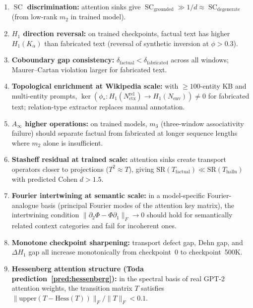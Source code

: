 \documentclass[11pt]{amsart}
\theoremstyle{definition}
\newcommand{\Nctx}{N_{\mathrm{ctx}}}
\newcommand{\Nenv}{N_{\mathrm{env}}}
\newcommand{\Ka}{K_\alpha}
\newcommand{\cobdry}{\delta}
\DeclareMathOperator{\SC}{SC}
\begin{document}
\begin{enumerate}
\item \textbf{$\SC$ discrimination:}
  attention sinks give $\SC_{\mathrm{grounded}} \gg 1/d \approx \SC_{\mathrm{degenerate}}$
  (from low-rank $m_2$ in trained model).

\item \textbf{$H_1$ direction reversal:}
  on trained checkpoints, factual text has higher $H_1(\Ka)$ than
  fabricated text (reversal of synthetic inversion at $\phi > 0.3$).

\item \textbf{Coboundary gap consistency:}
  $\cobdry_{\mathrm{factual}} < \cobdry_{\mathrm{fabricated}}$
  across all windows; Maurer--Cartan violation larger for fabricated text.

\item \textbf{Topological enrichment at Wikipedia scale:}
  with $\geq 100$-entity KB and multi-entity prompts,
  $\ker(\phi_*: H_1(\Nctx^{\mathrm{rel}}) \to H_1(\Nenv)) \neq 0$
  for fabricated text; relation-type extractor replaces manual annotation.

\item \textbf{$A_\infty$ higher operations:}
  on trained models, $m_3$ (three-window associativity failure)
  should separate factual from fabricated at longer sequence lengths
  where $m_2$ alone is insufficient.

\item \textbf{Stasheff residual at trained scale:}
  attention sinks create transport operators closer to projections ($T^2\approx T$),
  giving $\mathrm{SR}(T_{\mathrm{factual}}) \ll \mathrm{SR}(T_{\mathrm{hallu}})$
  with predicted Cohen $d > 1.5$.

\item \textbf{Fourier intertwining at semantic scale:}
  in a model-specific Fourier-analogue basis (principal Fourier modes of
  the attention key matrix), the intertwining condition
  $\|\partial_2\Phi - \Phi\partial_1\|_F \to 0$ should hold for
  semantically related context categories and fail for incoherent ones.

\item \textbf{Monotone checkpoint sharpening:}
  transport defect gap, Dehn gap, and $\Delta H_1$ gap all increase
  monotonically from checkpoint~0 to checkpoint~500K.

\item \textbf{Hessenberg attention structure (Toda prediction~\ref{pred:hessenberg}):}
  in the spectral basis of real GPT-2 attention weights, the transition
  matrix $T$ satisfies
  $\|\mathrm{upper}(T - \mathrm{Hess}(T))\|_F / \|T\|_F < 0.1$.


\end{enumerate}
\end{document}
